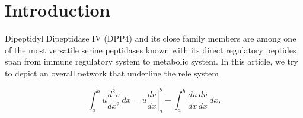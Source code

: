 \section{Introduction}
\label{intro} 

Dipeptidyl Dipeptidase IV (DPP4) and its close family members are among one of the most versatile serine peptidases known with its direct regulatory peptides span from immune regulatory system to metabolic system. In this article, we try to depict an overall network that underline the rele system 

\begin{equation}
\label{eqn:drag}
	\int_a^bu\frac{d^2v}{dx^2}\,dx
	=\left.u\frac{dv}{dx}\right|_a^b
	-\int_a^b\frac{du}{dx}\frac{dv}{dx}\,dx.
\end{equation}
